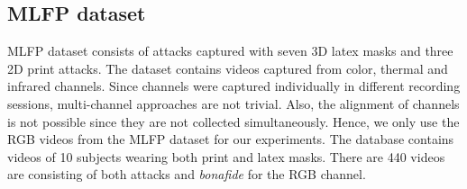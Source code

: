 \documentclass[journal]{IEEEtran}
\begin{document}
\begin{table}[ht]
\centering
\caption{Statistics of attacks in \textit{WMCA} database}
\label{tab:stats_wmca}
\end{table}

\subsection{MLFP dataset}

MLFP dataset \cite{agarwal2017face} consists of attacks captured with seven 3D latex masks and three 2D print attacks. The dataset contains videos captured from color, thermal and infrared channels. Since channels were captured individually in different recording sessions, multi-channel approaches are not trivial. Also, the alignment of channels is not possible since they are not collected simultaneously. Hence, we only use the RGB videos from the MLFP dataset for our experiments. The database contains videos of 10 subjects wearing both print and latex masks. There are 440 videos are consisting of both attacks and \textit{bonafide} for the RGB channel.
\end{document}
